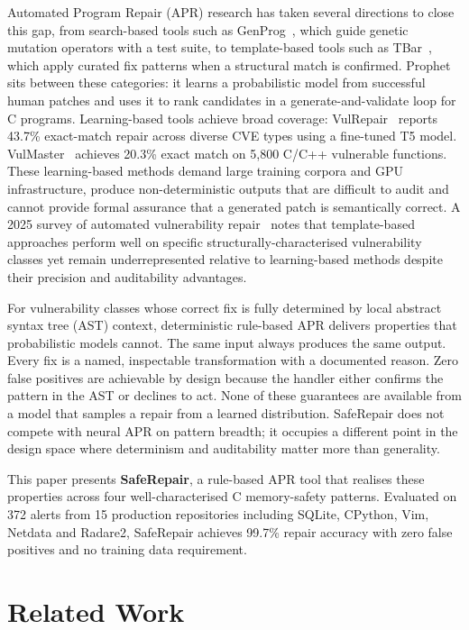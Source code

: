 \documentclass[conference]{IEEEtran}
\begin{document}
Automated Program Repair (APR) research has taken several directions to close this
gap, from search-based tools such as GenProg~\cite{b8}, which guide genetic mutation
operators with a test suite, to template-based tools such as TBar~\cite{b10}, which
apply curated fix patterns when a structural match is confirmed.
Prophet~\cite{b11} sits between these categories: it learns a probabilistic model from
successful human patches and uses it to rank candidates in a generate-and-validate
loop for C programs. Learning-based tools achieve broad coverage: VulRepair~\cite{b4}
reports 43.7\% exact-match repair across diverse CVE types using a fine-tuned T5
model. VulMaster~\cite{b3} achieves 20.3\% exact match on 5,800 C/C++ vulnerable
functions. These learning-based methods
demand large training corpora and GPU infrastructure, produce non-deterministic
outputs that are difficult to audit and cannot provide formal assurance that a
generated patch is semantically correct. A 2025 survey of automated vulnerability
repair~\cite{b1} notes that template-based approaches perform well on specific
structurally-characterised vulnerability classes yet remain underrepresented
relative to learning-based methods despite their precision and auditability
advantages.

For vulnerability classes whose correct fix is fully determined by local abstract
syntax tree (AST) context, deterministic rule-based APR delivers properties that
probabilistic models cannot. The same input always produces the same output. Every
fix is a named, inspectable transformation with a documented reason. Zero false
positives are achievable by design because the handler either confirms the pattern
in the AST or declines to act. None of these guarantees are available from a model
that samples a repair from a learned distribution. SafeRepair does not compete
with neural APR on pattern breadth; it occupies a different point in the design
space where determinism and auditability matter more than generality.

This paper presents \textbf{SafeRepair}, a rule-based APR tool that realises these
properties across four well-characterised C memory-safety patterns. Evaluated on 372
alerts from 15 production repositories including SQLite, CPython, Vim, Netdata and
Radare2, SafeRepair achieves 99.7\% repair accuracy with zero false positives and no
training data requirement.


\section{Related Work}
\end{document}

